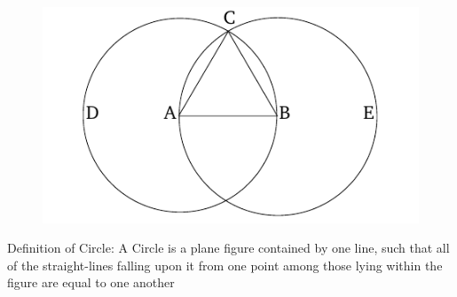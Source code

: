 \documentclass[10 pt]{article}
\begin{document}
\begin{figure}[h!]
\centering
\includegraphics[scale=0.7]{circle}
\end{figure}

\noindent Definition of Circle: A Circle is a plane figure contained by one line, such that all of the straight-lines falling upon it from one point among those lying within the figure are equal to one another
\end{document}

